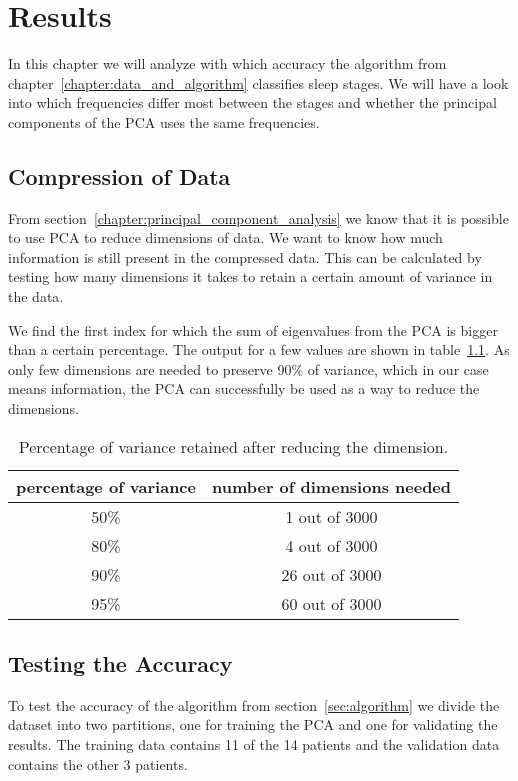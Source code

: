 \chapter{Results}
\label{chapter:results}

In this chapter we will analyze with which accuracy the algorithm from chapter~\ref{chapter:data_and_algorithm} classifies sleep stages. We will have a look into which frequencies differ most between the stages and whether the principal components of the PCA uses the same frequencies.

\section{Compression of Data}
From section~\ref{chapter:principal_component_analysis} we know that it is possible to use PCA to reduce dimensions of data. We want to know how much information is still present in the compressed data. This can be calculated by testing how many dimensions it takes to retain a certain amount of variance in the data.

We find the first index for which the sum of eigenvalues from the PCA is bigger than a certain percentage. The output for a few values are shown in table~\ref{tab:explained_variance}. As only few dimensions are needed to preserve 90\% of variance, which in our case means information, the PCA can successfully be used as a way to reduce the dimensions.

\begin{table}
	\centering
	\begin{tabular}{c|c}
		percentage of variance & number of dimensions needed \\
		\hline
		50\% & 1 out of 3000 \\
		80\% & 4 out of 3000 \\
		90\% & 26 out of 3000 \\
		95\% & 60 out of 3000 \\
	\end{tabular}
	\caption{Percentage of variance retained after reducing the dimension.}
	\label{tab:explained_variance}
\end{table}

\section{Testing the Accuracy}
To test the accuracy of the algorithm from section~\ref{sec:algorithm} we divide the dataset into two partitions, one for training the PCA and one for validating the results. The training data contains 11 of the 14 patients and the validation data contains the other 3 patients.

